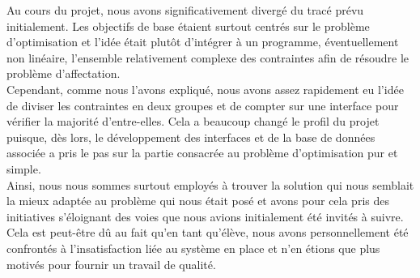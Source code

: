 \documentclass[12pt]{article}
\begin{document}
  Au cours du projet, nous avons significativement divergé du tracé prévu initialement. Les objectifs de base étaient surtout centrés sur le problème d’optimisation et l’idée était plutôt d’intégrer à un programme, éventuellement non linéaire, l’ensemble relativement complexe des contraintes afin de résoudre le problème d’affectation.  \\

  Cependant, comme nous l’avons expliqué, nous avons assez rapidement eu l’idée de diviser les contraintes en deux groupes et de compter sur une interface pour vérifier la majorité d’entre-elles. Cela a beaucoup changé le profil du projet puisque, dès lors, le développement des interfaces et de la base de données associée a pris le pas sur la partie consacrée au problème d’optimisation pur et simple. \\
  
  Ainsi, nous nous sommes surtout employés à trouver la solution qui nous semblait la mieux adaptée au problème qui nous était posé et avons pour cela pris des initiatives s’éloignant des voies que nous avions initialement été invités à suivre. Cela est peut-être dû au fait qu’en tant qu’élève, nous avons personnellement été confrontés à l’insatisfaction liée au système en place et n’en étions que plus motivés pour fournir un travail de qualité. \\

    \newpage
    \printglossaries
	
	\newpage 
	
	\printindex[mot] %
	
	\newpage
	
	\printindex[auteur] %
	
	\newpage
	
    
	\newpage



\end{document}
